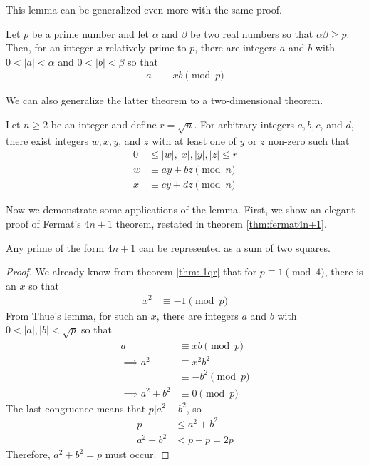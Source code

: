 \documentclass{subfile}
\begin{document}
	This lemma can be generalized even more with the same proof.
	\begin{theorem}
		Let $p$ be a prime number and let $\alpha$ and $\beta$ be two real numbers so that $\alpha\beta \geq p$. Then, for an integer $x$ relatively prime to $p$, there are integers $a$ and $b$ with $0<|a|<\alpha$ and $0<|b|<\beta $ so that
		\begin{align*}
			a & \equiv xb\pmod p
		\end{align*}
	\end{theorem}
	We can also generalize the latter theorem to a two-dimensional theorem.
	\begin{theorem}
		Let $n\geq2$ be an integer and define $r=\sqrt{n}$. For arbitrary integers $a,b,c$, and $d$, there exist integers $w,x,y$, and $z$ with at least one of $y$ or $z$ non-zero such that
		\begin{align*}
			0& \leq |w|,|x|,|y|,|z|\leq r\\
			w&\equiv ay+bz\pmod n\\
			x&\equiv cy+dz\pmod n
		\end{align*}
	\end{theorem}


	Now we demonstrate some applications of the lemma. First, we show an elegant proof of Fermat's $4n+1$ theorem, restated in theorem \autoref{thm:fermat4n+1}.

	\begin{theorem}\label{thm:fermat4n+1}
		Any prime of the form $4n+1$ can be represented as a sum of two squares.
	\end{theorem}

	\begin{proof}
		We already know from theorem \autoref{thm:-1qr} that for $p\equiv1\pmod4$, there is an $x$ so that
		\begin{align*}
			x^2 & \equiv-1\pmod p
		\end{align*}
		From Thue's lemma, for such an $x$, there are integers $a$ and $b$ with $0<|a|,|b|<\sqrt{p}$ so that
		\begin{align*}
			a
				& \equiv xb \pmod p\\
			\implies a^2
				& \equiv x^2b^2\\
				& \equiv -b^2\pmod p\\
			\implies a^2+b^2
				& \equiv 0 \pmod p
		\end{align*}
		The last congruence means that $p|a^2+b^2$, so
		\begin{align*}
			p   &\leq a^2+b^2\\
			a^2+b^2	&< p+p = 2p
		\end{align*}
		Therefore, $a^2+b^2=p$ must occur.
	\end{proof}
\end{document}
